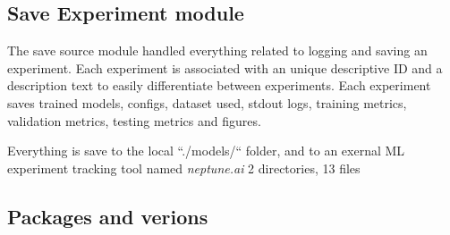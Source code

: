 \iffalse
The configuration module is to keep everything which is configurable and relevant
for the experiment in one place. This helps keeping code changes down to a minumum,
and it's easy to go back in time and check details of a ran experiment at a glans.

The experiment pipeline contains multiple paramteres that can be adjusted and configured to alter the experiments.
Configuration is done through the use of the ``config.yaml'' file defined in the project source code.
This config file is used to configure the different aspects of the projects to be run.
Ranging from the selected dataset and data files to be used, to the selected model and model structure, with model parameters and random seed.

The config is parsed through at runtime reading the needed information when it becomes relevant.
The file can be found in the source code at ``./config.yaml''.
An example of a config is in the appendix at \Cref{cha:experiment-framework-example-config}.
\fi



\subsection{Save Experiment module}

The save source module handled everything related to logging and saving an experiment.
Each experiment is associated with an unique descriptive ID and a description text to easily
differentiate between experiments.
Each experiment saves trained models, configs, dataset used, stdout logs, training metrics, validation metrics,
testing metrics and figures.

Everything is save to the local ``./models/`` folder, and to an exernal ML experiment tracking tool
named \textit{neptune.ai}
2 directories, 13 files

\subsection{Packages and verions}

